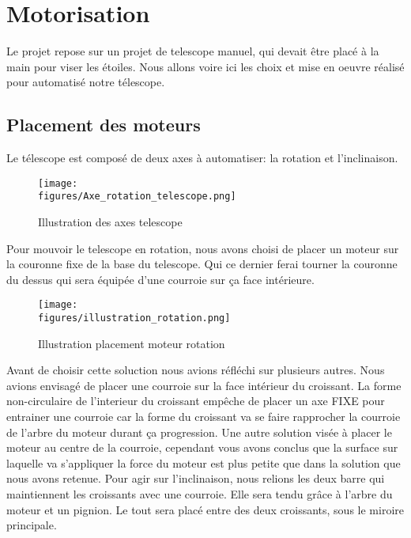 \chapter{Motorisation}
\label{chapter1}

Le projet repose sur un projet de telescope manuel, qui devait être placé à la main pour viser les étoiles.
Nous allons voire ici les choix et mise en oeuvre réalisé pour automatisé notre télescope.

\section{Placement des moteurs}

Le télescope est composé de deux axes à automatiser: la rotation et l'inclinaison. 

\begin{figure}[H]
    \centering
	\texttt{[image: \\figures/Axe\_rotation\_telescope.png]}
    \decoRule
    \caption[
    Illustration des axes telescope]{
    Illustration des axes telescope}
    \label{fig:Illustration des axes telescope}
    \end{figure}

Pour mouvoir le telescope en rotation, nous avons choisi de placer un moteur sur la couronne fixe de la base du telescope. Qui ce dernier ferai tourner la couronne du dessus qui sera équipée d'une courroie sur ça face intérieure. 

\begin{figure}[H]
    \centering
	\texttt{[image: \\figures/illustration\_rotation.png]}
    \decoRule
    \caption[
    Illustration placement moteur rotation]{
    Illustration placement moteur rotation}
    \label{fig:Illustration placement moteur rotation}
    \end{figure}
Avant de choisir cette soluction nous avions réfléchi sur plusieurs autres. Nous avions envisagé de placer une courroie sur la face intérieur du croissant. La forme non-circulaire de l'interieur du croissant empêche de placer un axe FIXE pour entrainer une courroie car la forme du croissant va se faire rapprocher la courroie de l'arbre du moteur durant ça progression.
Une autre solution visée à placer le moteur au centre de la courroie, cependant vous avons conclus que la surface sur laquelle va s'appliquer la force du moteur est plus petite que dans la solution que nous avons retenue.
\newline
\newline
Pour agir sur l'inclinaison, nous relions les deux barre qui maintiennent les croissants avec une courroie. Elle sera tendu grâce à l'arbre du moteur et un pignion. Le tout sera placé entre des deux croissants, sous le miroire principale.

